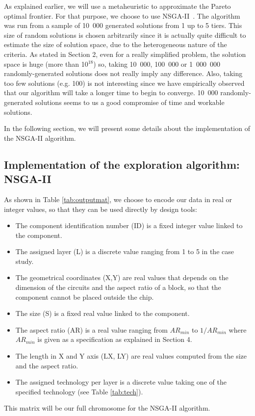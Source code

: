 As explained earlier, we will use a metaheuristic to approximate the Pareto optimal frontier. For that purpose, we choose to use NSGA-II~\cite{Deb00afast}. The algorithm was run from a sample of 10~000 generated solutions from 1 up to 5 tiers. This size of random solutions is chosen arbitrarily since it is actually quite difficult to estimate the size of solution space, due to the heterogeneous nature of the criteria. As stated in Section 2, even for a really simplified problem, the solution space is huge (more than 10$^{18}$) so, taking 10~000, 100~000 or 1~000~000 randomly-generated solutions does not really imply any difference. Also, taking too few solutions (e.g. 100) is not interesting since we have empirically observed that our algorithm will take a longer time to begin to converge. 10~000 randomly-generated solutions seems to us a good compromise of time and workable solutions.


In the following section, we will present some details about the implementation of the NSGA-II algorithm.

\subsection{Implementation of the exploration algorithm: NSGA-II}
As shown in Table \ref{tab:outputmat}, we choose to encode our data in real or integer values, so that they can be used directly by design tools:
\begin{itemize}
\item The component identification number (ID) is a fixed integer value linked to the component.
\item The assigned layer (L) is a discrete value ranging from 1 to 5 in the case study.
\item The geometrical coordinates (X,Y) are real values that depends on the dimension of the circuits and the aspect ratio of a block, so that the component cannot be placed outside the chip.
\item The size (S) is a fixed real value linked to the component.
\item The aspect ratio (AR) is a real value ranging from $AR_{min}$ to $1/AR_{min}$ where $AR_{min}$ is given as a specification as explained in Section 4.
\item The length in X and Y axis (LX, LY) are real values computed from the size and the aspect ratio.
\item The assigned technology per layer is a discrete value taking one of the specified technology (see Table \ref{tab:tech}).
\end{itemize}
This matrix will be our full chromosome for the NSGA-II algorithm.

